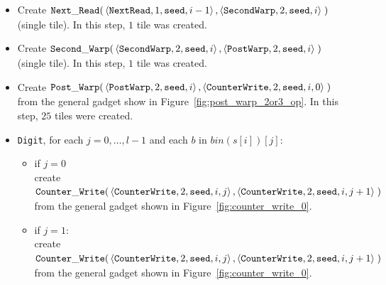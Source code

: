 \begin{itemize}
    \item Create
    $\begin{aligned}[t]
            {\tt Next\_Read}(&\left\langle {\tt NextRead},   1, {\tt seed}, i - 1\right\rangle,
                       \left\langle {\tt SecondWarp}, 2, {\tt seed}, i    \right\rangle \;)
    \end{aligned}$\\ (single tile).
    In this step, $1$ tile was created.

    \item Create
    $\begin{aligned}[t]
        {\tt Second\_Warp}(&\left\langle {\tt SecondWarp}, 2, {\tt seed}, i \right\rangle,
                     \left\langle {\tt PostWarp},   2, {\tt seed}, i \right\rangle \;)
    \end{aligned}$ (single tile).
    In this step, $1$ tile was created.

    \item Create
    $\begin{aligned}[t]
        {\tt Post\_Warp}(&\left\langle {\tt PostWarp}, 2, {\tt seed}, i    \right\rangle,
                   \left\langle {\tt CounterWrite},    2, {\tt seed}, i, 0 \right\rangle \;)
    \end{aligned}$\\ from the general gadget show in Figure~\ref{fig:post_warp_2or3_op}.
    In this step, $25$ tiles were created.

    \item {\tt Digit}, for each $j=0,\ldots,l-1$ and each $b$ in $bin(s[i])[j]$:
    \begin{itemize}
        \item if $j = 0$\\ create
        $\begin{aligned}[t]
            {\tt Counter\_Write}(&\left\langle {\tt CounterWrite}, 2, {\tt seed}, i, j \right\rangle, \left\langle {\tt CounterWrite}, 2, {\tt seed}, i, j + 1 \right\rangle \;)
        \end{aligned}$\\from the general gadget shown in Figure~\ref{fig:counter_write_0}.

        \item if $j = 1$:\\ create
        $\begin{aligned}[t]
            {\tt Counter\_Write}(&\left\langle {\tt CounterWrite}, 2, {\tt seed}, i, j \right\rangle, \left\langle {\tt CounterWrite}, 2, {\tt seed}, i, j + 1 \right\rangle \;)
        \end{aligned}$\\from the general gadget shown in Figure~\ref{fig:counter_write_0}.


\end{itemize}
\end{itemize}
